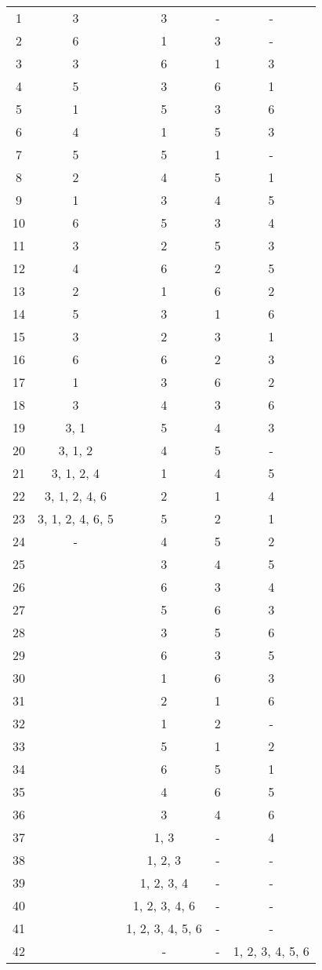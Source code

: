 \begin{table*}[h]
\begin{center}
\begin{tabular}{c c c c c}
1	&	3					&	3					&	-	&	-	\\
2	&	6					&	1					&	3	&	-	\\
3	&	3					&	6					&	1	&	3	\\
4	&	5					&	3					&	6	&	1	\\
5	&	1					&	5					&	3	&	6	\\
6	& 	4					&	1					&	5	&	3	\\
7	&	5					&	5					&	1	&	-	\\
8	&	2					&	4					&	5	&	1	\\
9	&	1					&	3					&	4	&	5	\\
10	&	6					&	5					&	3	&	4	\\
11	&	3				 	&	2					&	5	&	3	\\
12	&	4					&	6					&	2	&	5	\\
13	&	2					&	1					&	6	&	2	\\
14	&	5					&	3					&	1	&	6	\\
15	&	3					&	2					&	3	&	1	\\
16	&	6					&	6					&	2	&	3	\\
17	&	1					&	3					&	6	&	2	\\
18	&	3					&	4					&	3	&	6	\\
19	&	3, 1				&	5					&	4	&	3	\\
20	&	3, 1, 2				&	4					&	5	&	-	\\
21	&	3, 1, 2, 4			&	1					&	4	&	5	\\
22	&	3, 1, 2, 4, 6		&	2					&	1	&	4	\\
23	&	3, 1, 2, 4, 6, 5	&	5					&	2	&	1	\\
24	&	-					&	4					&	5	&	2	\\
25	&						&	3					&	4	&	5	\\
26	&						&	6					&	3	&	4	\\
27	&						&	5					&	6	&	3	\\
28	&						&	3					&	5	&	6	\\
29	&						&	6					&	3	&	5	\\
30	&						&	1					&	6	&	3	\\
31	&						&	2					&	1	&	6	\\
32	&						&	1					&	2	&	-	\\
33	&						&	5					&	1	&	2	\\
34	&						&	6					&	5	&	1	\\
35	&						&	4					&	6	&	5	\\
36	&						&	3					&	4	&	6	\\
37	&						&	1, 3				&	-	&	4	\\
38	&						&	1, 2, 3				&	-	&	-	\\
39	&						&	1, 2, 3, 4			&	-	&	-	\\
40	&						&	1, 2, 3, 4, 6		&	-	&	-	\\
41	&						&	1, 2, 3, 4, 5, 6	&	-	&	-	\\
42	&						&	-					&	-	&	1, 2, 3, 4, 5, 6	\\


\end{tabular}
\end{center}
\end{table*}
